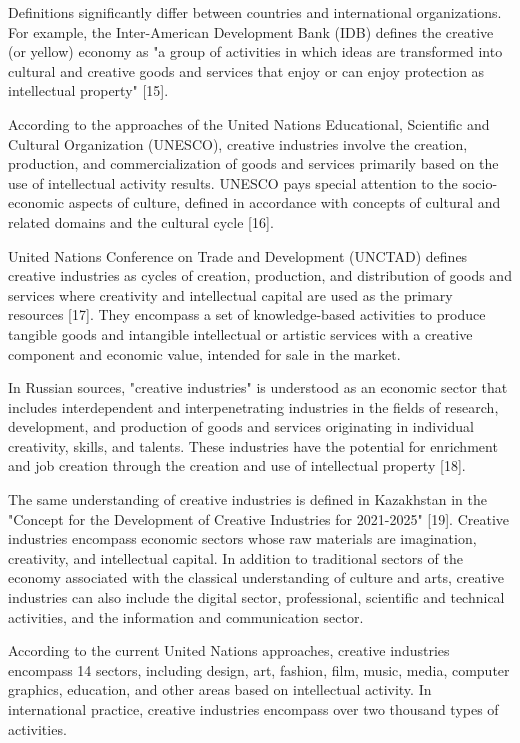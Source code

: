 \begin{multicols}{2}
Definitions significantly differ between countries and international
organizations. For example, the Inter-American Development Bank (IDB)
defines the creative (or yellow) economy as "a group of activities in
which ideas are transformed into cultural and creative goods and
services that enjoy or can enjoy protection as intellectual property"
{[}15{]}.

According to the approaches of the United Nations Educational,
Scientific and Cultural Organization (UNESCO), creative industries
involve the creation, production, and commercialization of goods and
services primarily based on the use of intellectual activity results.
UNESCO pays special attention to the socio-economic aspects of culture,
defined in accordance with concepts of cultural and related domains and
the cultural cycle {[}16{]}.

United Nations Conference on Trade and Development (UNCTAD) defines
creative industries as cycles of creation, production, and distribution
of goods and services where creativity and intellectual capital are used
as the primary resources {[}17{]}. They encompass a set of
knowledge-based activities to produce tangible goods and intangible
intellectual or artistic services with a creative component and economic
value, intended for sale in the market.

In Russian sources, "creative industries" is understood as an economic
sector that includes interdependent and interpenetrating industries in
the fields of research, development, and production of goods and
services originating in individual creativity, skills, and talents.
These industries have the potential for enrichment and job creation
through the creation and use of intellectual property {[}18{]}.

The same understanding of creative industries is defined in Kazakhstan
in the "Concept for the Development of Creative Industries for
2021-2025" {[}19{]}. Creative industries encompass economic sectors
whose raw materials are imagination, creativity, and intellectual
capital. In addition to traditional sectors of the economy associated
with the classical understanding of culture and arts, creative
industries can also include the digital sector, professional, scientific
and technical activities, and the information and communication sector.

According to the current United Nations approaches, creative industries
encompass 14 sectors, including design, art, fashion, film, music,
media, computer graphics, education, and other areas based on
intellectual activity. In international practice, creative industries
encompass over two thousand types of activities.


\end{multicols}
